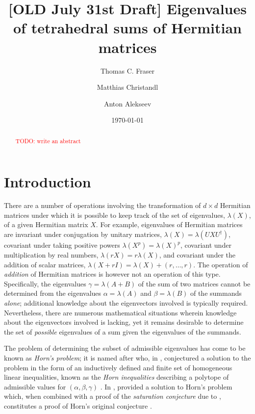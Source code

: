\documentclass[notitlepage, 10pt]{article}
\author[1]{Thomas C. Fraser}
\author[1]{Matthias Christandl}
\author[2]{Anton Alekseev}
\affil[1]{\small{Department of Mathematical Sciences, University of Copenhagen, Universitetsparken 5, 2100 Denmark}}
\affil[2]{\small{Anton's affiliations}}
\title{[OLD July 31st Draft] Eigenvalues of tetrahedral sums of Hermitian matrices}
\date{\today}
\begin{document}
\maketitle

\begin{abstract}
    \textcolor{red}{TODO: write an abstract}
\end{abstract}

\tableofcontents

\clearpage
\section{Introduction}

There are a number of operations involving the transformation of $d\times d$ Hermitian matrices under which it is possible to keep track of the set of eigenvalues, $\lambda(X)$, of a given Hermitian matrix $X$.
For example, eigenvalues of Hermitian matrices are invariant under conjugation by unitary matrices, $\lambda(X) = \lambda(UXU^{\dagger})$, covariant under taking positive powers $\lambda(X^p) = \lambda(X)^p$, covariant under multiplication by real numbers, $\lambda(r X) = r \lambda(X)$, and covariant under the addition of scalar matrices, $\lambda(X+rI) = \lambda(X) + (r,\ldots,r)$.
The operation of \textit{addition} of Hermitian matrices is however not an operation of this type.
Specifically, the eigenvalues $\gamma = \lambda(A+B)$ of the sum of two matrices cannot be determined from the eigenvalues $\alpha = \lambda(A)$ and $\beta = \lambda(B)$ of the summands \textit{alone}; additional knowledge about the eigenvectors involved is typically required.
Nevertheless, there are numerous mathematical situations wherein knowledge about the eigenvectors involved is lacking, yet it remains desirable to determine the set of \textit{possible} eigenvalues of a sum given the eigenvalues of the summands.

The problem of determining the subset of admissible eigenvalues has come to be known as \textit{Horn's problem}; it is named after \citeauthor{horn1962eigenvalues} who, in \citeyear{horn1962eigenvalues}, conjectured a solution to the problem in the form of an inductively defined and finite set of homogeneous linear inequalities, known as the \textit{Horn inequalities} describing a polytope of admissible values for $(\alpha,\beta,\gamma)$ \cite{horn1962eigenvalues}.
In \citeyear{klyachko1998stable}, \citeauthor{klyachko1998stable} provided a solution to Horn's problem \cite{klyachko1998stable} which, when combined with a proof of the \textit{saturation conjecture} due to \citeauthor{knutson1999honeycomb} \cite{knutson1999honeycomb}, constitutes a proof of Horn's original conjecture \cite{fulton1998eigenvalues}.
\end{document}
